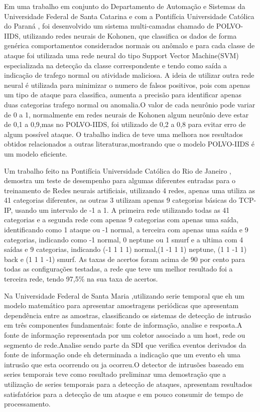 \documentclass[
	12pt,				%
	openright,			%
	oneside,
	a4paper,			%
	english,			%
	french,				%
	spanish,			%
	brazil				%
	]{abntex2}
\begin{document}
Em uma trabalho em conjunto do Departamento de Automação e Sistemas da Universidade Federal de Santa Catarina \cite{polvo1} e com a Pontifícia Universidade Católica do Paraná \cite{polvo2}, foi desenvolvido um sistema multi-camadas chamado de POLVO-IIDS, utilizando redes neurais de Kohonen, que classifica os dados de forma
genérica comportamentos considerados normais ou anômalo e para cada classe de ataque foi utilizada uma rede neural do tipo Support Vector Machine(SVM) especializada na detecção da classe correspondente e tendo como saída a indicação de trafego normal ou atividade maliciosa.
A ideia de utilizar outra rede neural é utilizada para minimizar o numero de falsos positivos, pois com apenas um tipo de ataque para classifica, aumenta a precisão para identificar apenas duas categorias trafego normal ou anomalia.O valor de cada neurônio pode variar de 0 a 1, normalmente em redes neurais de Kohonen algum neurônio deve estar de 0,1 a 0,9,mas no POLVO-IIDS, foi utilizado de 0,2 a 0,8 para evitar erro de algum possível ataque. O trabalho indica de teve uma melhora nos resultados obtidos relacionados a outras literaturas,mostrando que o modelo POLVO-IIDS é um modelo eficiente.

Um trabalho feito na Pontifícia Universidade Católica do Rio de Janeiro \cite{RenatoMaia}, demostra um teste de desempenho para algumas diferentes entradas para o treinamento de Redes neurais artificiais,
utilizando 4 redes, apenas uma utiliza as 41 categorias diferentes, as outras 3 utilizam apenas 9 categorias básicas do TCP-IP, usando um intervalo de -1 a 1. A primeira rede utilizando todas as 41 categorias e a segunda rede com apenas 9 categorias com apenas uma saída, identificando como 1 ataque ou -1 normal, a terceira com apenas uma saída e 9 categorias, indicando como -1 normal, 0 neptune ou 1 smurf e a ultima com 4 saídas e 9 categorias, indicando (-1 1 1 1) normal,(1 -1 1 1) neptune, (1 1 -1 1) back e (1 1 1 -1) smurf. As taxas de acertos foram acima de 90 por cento para todas as configurações testadas, a rede que teve um melhor resultado foi a terceira rede, tendo 97,5\% na sua taxa de acertos.


Na Universidade Federal de Santa Maria \cite{Dalmazo},utilizando serie temporal que eh um modelo matemático para apresentar amostragens periódicas que apresentam dependência entre as amostras, classificando os sistemas de detecção de intrusão em três componentes fundamentais: fonte de informação, analise e resposta.A fonte de informação representada por um coletor associado a um host, rede ou segmento de rede.Analise sendo parte da SDI que verifica eventos derivados da fonte de informação onde eh determinada a indicação que um evento eh uma intrusão que esta ocorrendo ou ja ocorreu.O detector de intrusões baseado em series temporais teve como resultado preliminar uma demostração que a utilização de series temporais para a detecção de ataques, apresentam resultados satisfatórios para a detecção de um ataque e em pouco consumir de tempo de processamento.
\end{document}
